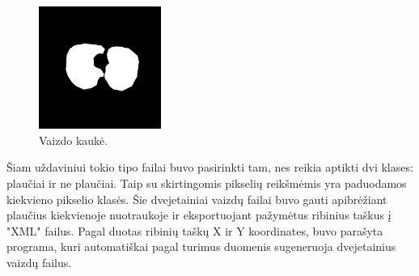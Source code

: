 \documentclass{VUMIFInfKursinis}
\begin{document}
\begin{figure}[ht]
  \centering
  \includegraphics[width=4cm,height=4cm,keepaspectratio]{mask.png}
  \caption{Vaizdo kaukė.}
  \label{fig:kaukė1}
\end{figure}

\par
Šiam uždaviniui tokio tipo failai buvo pasirinkti tam, nes reikia aptikti dvi klases:
plaučiai ir ne plaučiai. Taip su skirtingomis pikselių reikšmėmis yra paduodamos kiekvieno
pikselio klasės. Šie dvejetainiai vaizdų failai buvo gauti apibrėžiant plaučius kiekvienoje
nuotraukoje ir eksportuojant pažymėtus ribinius taškus į "XML" failus. Pagal duotas ribinių
taškų X ir Y koordinates, buvo parašyta programa, kuri automatiškai pagal turimus
duomenis sugeneruoja dvejetainius vaizdų failus.
\par








\end{document}
